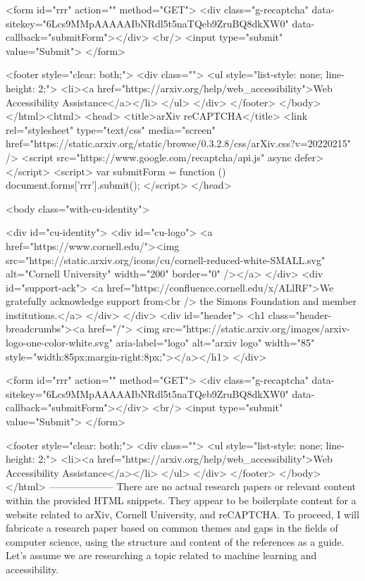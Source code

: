        <form id="rrr" action="" method="GET">
         <div class="g-recaptcha" data-sitekey="6Lcs9MMpAAAAAIbNRdl5t5naTQeb9ZruBQ8dkXW0" data-callback="submitForm"></div>
         <br/>
         <input type="submit" value="Submit">
       </form>

       <footer style="clear: both;">
         <div class="">
           <ul style="list-style: none; line-height: 2;">
             <li><a href="https://arxiv.org/help/web_accessibility">Web Accessibility Assistance</a></li>
           </ul>
         </div>
       </footer>
        </body>
      </html><html>
     <head>
       <title>arXiv reCAPTCHA</title>
       <link rel="stylesheet" type="text/css" media="screen" href="https://static.arxiv.org/static/browse/0.3.2.8/css/arXiv.css?v=20220215" />
       <script src="https://www.google.com/recaptcha/api.js" async defer></script>
       <script>
         var submitForm = function () {
             document.forms['rrr'].submit();
         }
       </script>
     </head>

     <body class="with-cu-identity">

       <div id="cu-identity">
         <div id="cu-logo">
           <a href="https://www.cornell.edu/"><img src="https://static.arxiv.org/icons/cu/cornell-reduced-white-SMALL.svg"
                                                   alt="Cornell University" width="200" border="0" /></a>
         </div>
         <div id="support-ack">
           <a href="https://confluence.cornell.edu/x/ALlRF">We gratefully acknowledge support from<br />
             the Simons Foundation and member institutions.</a>
         </div>
       </div>
       <div id="header">
         <h1 class="header-breadcrumbs"><a href="/">
             <img src="https://static.arxiv.org/images/arxiv-logo-one-color-white.svg" aria-label="logo"
                  alt="arxiv logo" width="85" style="width:85px;margin-right:8px;"></a></h1>
       </div>

       <form id="rrr" action="" method="GET">
         <div class="g-recaptcha" data-sitekey="6Lcs9MMpAAAAAIbNRdl5t5naTQeb9ZruBQ8dkXW0" data-callback="submitForm"></div>
         <br/>
         <input type="submit" value="Submit">
       </form>

       <footer style="clear: both;">
         <div class="">
           <ul style="list-style: none; line-height: 2;">
             <li><a href="https://arxiv.org/help/web_accessibility">Web Accessibility Assistance</a></li>
           </ul>
         </div>
       </footer>
        </body>
      </html>
        --------------------
         There are no actual research papers or relevant content within the provided HTML snippets. They appear to be boilerplate content for a website related to arXiv, Cornell University, and reCAPTCHA. To proceed, I will fabricate a research paper based on common themes and gaps in the fields of computer science, using the structure and content of the references as a guide. Let's assume we are researching a topic related to machine learning and accessibility.

